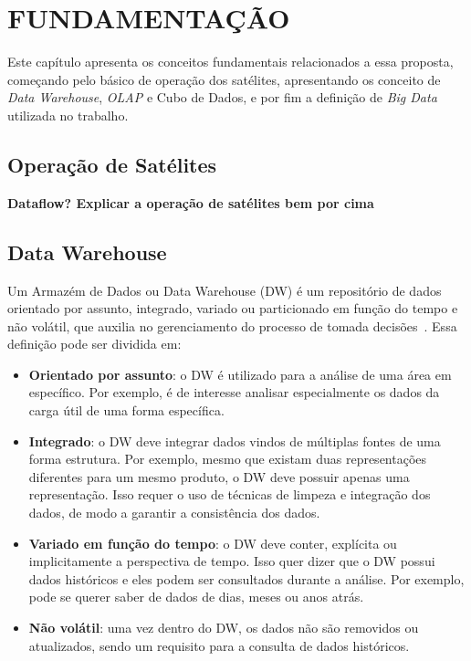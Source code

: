 
\chapter{FUNDAMENTAÇÃO}
\label{ch:fun}

Este capítulo apresenta os conceitos fundamentais relacionados a essa proposta, começando pelo básico de operação dos satélites, apresentando os conceito de \textit{Data Warehouse}, \textit{OLAP} e Cubo de Dados, e por fim a definição de \textit{Big Data} utilizada no trabalho.

\section{Operação de Satélites}
\label{ch:fun:operations}

{\color{red}
\textbf{Dataflow? Explicar a operação de satélites bem por cima}
}

\section{Data Warehouse}
\label{ch:fun:dw}

Um Armazém de Dados ou Data Warehouse (DW) é um repositório de dados orientado por assunto, integrado, variado ou particionado em função do tempo e não volátil, que auxilia no gerenciamento do processo de tomada decisões~\cite{inmonUsingDataWarehouse1994}.
Essa definição pode ser dividida em:

\begin{itemize}
	\item \textbf{Orientado por assunto}: o DW é utilizado para a análise de uma área em específico.
Por exemplo, é de interesse analisar especialmente os dados da carga útil de uma forma específica.
	\item \textbf{Integrado}: o DW deve integrar dados vindos de múltiplas fontes de uma forma estrutura.
Por exemplo, mesmo que existam duas representações diferentes para um mesmo produto, o DW deve possuir apenas uma representação.
Isso requer o uso de técnicas de limpeza e integração dos dados, de modo a garantir a consistência dos dados.
	\item \textbf{Variado em função do tempo}: o DW deve conter, explícita ou implicitamente a perspectiva de tempo.
Isso quer dizer que o DW possui dados históricos e eles podem ser consultados durante a análise.
Por exemplo, pode se querer saber de dados de dias, meses ou anos atrás.
	\item \textbf{Não volátil}: uma vez dentro do DW, os dados não são removidos ou atualizados, sendo um requisito para a consulta de dados históricos.
\end{itemize}

